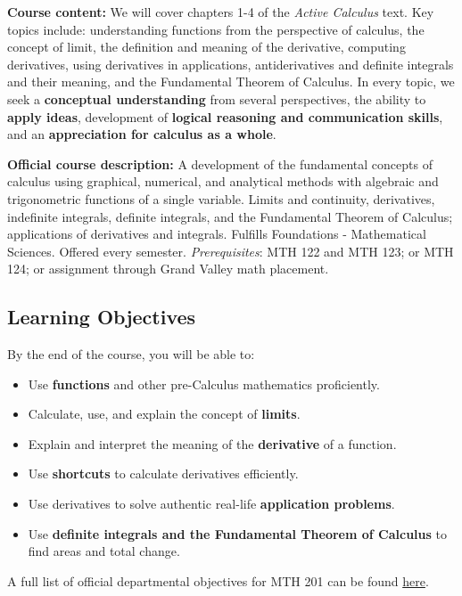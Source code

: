\documentclass[]{article}
\providecommand{\tightlist}{%
  \setlength{\itemsep}{0pt}\setlength{\parskip}{0pt}}
\begin{document}
\textbf{Course content:} We will cover chapters 1-4 of the \emph{Active
Calculus} text. Key topics include: understanding functions from the
perspective of calculus, the concept of limit, the definition and
meaning of the derivative, computing derivatives, using derivatives in
applications, antiderivatives and definite integrals and their meaning,
and the Fundamental Theorem of Calculus. In every topic, we seek a
\textbf{conceptual understanding} from several perspectives, the ability
to \textbf{apply ideas}, development of \textbf{logical reasoning and
communication skills}, and an \textbf{appreciation for calculus as a
whole}.

\textbf{Official course description:} A development of the fundamental
concepts of calculus using graphical, numerical, and analytical methods
with algebraic and trigonometric functions of a single variable. Limits
and continuity, derivatives, indefinite integrals, definite integrals,
and the Fundamental Theorem of Calculus; applications of derivatives and
integrals. Fulfills Foundations - Mathematical Sciences. Offered every
semester. \emph{Prerequisites}: MTH 122 and MTH 123; or MTH 124; or
assignment through Grand Valley math placement.

\hypertarget{learning-objectives}{%
\subsection{Learning Objectives}\label{learning-objectives}}

By the end of the course, you will be able to:

\begin{itemize}
\tightlist
\item
  Use \textbf{functions} and other pre-Calculus mathematics
  proficiently.
\item
  Calculate, use, and explain the concept of \textbf{limits}.
\item
  Explain and interpret the meaning of the \textbf{derivative} of a
  function.
\item
  Use \textbf{shortcuts} to calculate derivatives efficiently.
\item
  Use derivatives to solve authentic real-life \textbf{application
  problems}.
\item
  Use \textbf{definite integrals and the Fundamental Theorem of
  Calculus} to find areas and total change.
\end{itemize}

A full list of official departmental objectives for MTH 201 can be found
\href{https://www.gvsu.edu/cms4/asset/9A420BCF-BA9E-0845-91754145EA82C51F/sor_descriptions_objectives__topics_for_faculty_updated_12-11-19.pdf}{here}.
\end{document}
